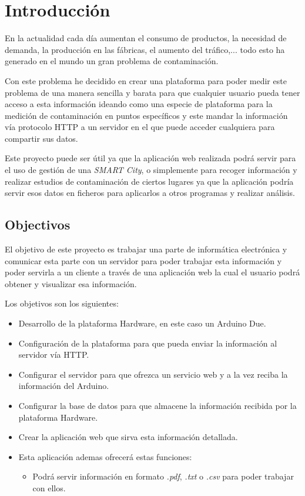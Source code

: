 
\chapter{Introducción}

	En la actualidad cada día aumentan el consumo de productos, la necesidad de demanda, la producción en las fábricas, el aumento del tráfico,... todo esto ha generado en el mundo un gran problema de contaminación.
	
	Con este problema he decidido en crear una plataforma para poder medir este problema de una manera sencilla y barata para que cualquier usuario pueda tener acceso a esta información ideando como una especie de plataforma para la medición de contaminación en puntos específicos y este mandar la información vía protocolo HTTP a un servidor en el que puede acceder cualquiera para compartir sus datos.
	
	Este proyecto puede ser útil ya que la aplicación web realizada podrá servir para el uso de gestión de una \textit{SMART City}, o simplemente para recoger información y realizar estudios de contaminación de ciertos lugares ya que la aplicación podría servir esos datos en ficheros para aplicarlos a otros programas y realizar análisis.

\section{Objectivos}

El objetivo de este proyecto es trabajar una parte de informática electrónica y comunicar esta parte con un servidor para poder trabajar esta información y poder servirla a un cliente a través de una aplicación web la cual el usuario podrá obtener y visualizar esa información.

Los objetivos son los siguientes:

\begin{itemize}
\item Desarrollo de la plataforma Hardware, en este caso un Arduino Due.
\item Configuración de la plataforma para que pueda enviar la información al servidor vía HTTP.
\item Configurar el servidor para que ofrezca un servicio web y a la vez reciba la información del Arduino.
\item Configurar la base de datos para que almacene la información recibida por la plataforma Hardware.
\item Crear la aplicación web que sirva esta información detallada.
\item Esta aplicación ademas ofrecerá estas funciones:
	\begin{itemize}
	\item Podrá servir información en formato \textit{.pdf}, \textit{.txt} o \textit{.csv} para poder trabajar con ellos.
	
	\end{itemize}
\end{itemize}


